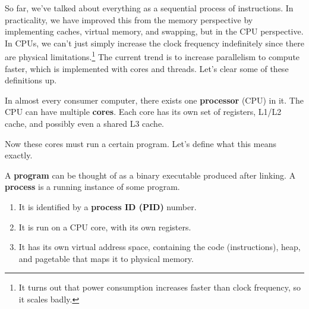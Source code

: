 \documentclass{article}
\begin{document}
    So far, we've talked about everything as a sequential process of instructions. In practicality, we have improved this from the memory perspective by implementing caches, virtual memory, and swapping, but in the CPU perspective. In CPUs, we can't just simply increase the clock frequency indefinitely since there are physical limitations.\footnote{It turns out that power consumption increases faster than clock frequency, so it scales badly.} The current trend is to increase parallelism to compute faster, which is implemented with cores and threads. Let's clear some of these definitions up. 

    \begin{definition}
      In almost every consumer computer, there exists one \textbf{processor} (CPU) in it. The CPU can have multiple \textbf{cores}. Each core has its own set of registers, L1/L2 cache, and possibly even a shared L3 cache. 
    \end{definition}

    Now these cores must run a certain program. Let's define what this means exactly. 

    \begin{definition}
      A \textbf{program} can be thought of as a binary executable produced after linking. A \textbf{process} is a running instance of some program. 
      \begin{enumerate}
        \item It is identified by a \textbf{process ID (PID)} number. 
        \item It is run on a CPU core, with its own registers. 
        \item It has its own virtual address space, containing the code (instructions), heap, and pagetable that maps it to physical memory. 
      \end{enumerate}
    \end{definition}
\end{document}

